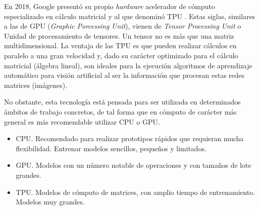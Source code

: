 En 2018, Google presentó su propio \textit{hardware} acelerador de cómputo especializado en cálculo matricial y al que denominó TPU \cite{tpu}. Estas siglas, similares a las de GPU (\textit{Graphic Porcessing Unit}), vienen de \textit{Tensor Processing Unit} o Unidad de procesamiento de tensores. Un tensor no es más que una matriz multidimensional. La ventaja de las TPU es que pueden realizar cálculos en paralelo a una gran velocidad y, dado su carácter optimizado para el cálculo matricial (álgebra lineal), son ideales para la ejecución algoritmos de aprendizaje automático para visión artificial al ser la información que procesan estas redes matrices (imágenes).

No obstante, esta tecnología está pensada para ser utilizada en determinados ámbitos de trabajo concretos, de tal forma que en cómputo de carácter más general es más recomendable utilizar CPU o GPU.

\begin{itemize}
    \item CPU. Recomendado para realizar prototipos rápidos que requieran mucha flexibilidad. Entrenar modelos sencillos, pequeños y limitados.
    \item GPU. Modelos con un número notable de operaciones y con tamaños de lote grandes.
    \item TPU. Modelos de cómputo de matrices, con amplio tiempo de entrenamiento. Modelos muy grandes.
\end{itemize}

